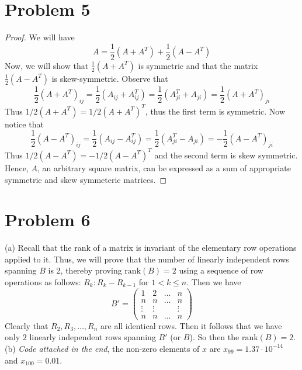 \documentclass{article}
\begin{document}
\section*{Problem 5}
\begin{proof} We will have
\begin{equation*}
    A = \frac{1}{2}(A + A^{T}) + \frac{1}{2}(A - A^{T})
\end{equation*}
Now, we will show that $\frac{1}{2}(A + A^{T})$ is symmetric and that the matrix $\frac{1}{2}(A-A^{T})$ is skew-symmetric. Observe that
\begin{equation*}
    \frac{1}{2}(A+A^{T})_{ij} = \frac{1}{2}(A_{ij} + A^{T}_{ij}) = \frac{1}{2}(A^{T}_{ji} + A_{ji}) = \frac{1}{2}(A + A^{T})_{ji}
\end{equation*}
Thus $1/2(A+A^{T}) = 1/2(A+A^{T})^{T}$, thus the first term is symmetric. Now notice that
\begin{equation*}
    \frac{1}{2}(A-A^{T})_{ij} = \frac{1}{2}(A_{ij} - A^{T}_{ij}) = \frac{1}{2}(A^{T}_{ji} - A_{ji}) = -\frac{1}{2}(A - A^{T})_{ji}
\end{equation*}
Thus $1/2(A-A^{T}) = -1/2(A-A^{T})^{T}$ and the second term is skew symmetric. Hence, $A$, an arbitrary square matrix, can be expressed as a sum of appropriate symmetric and skew symmeteric matrices.
\end{proof}
\section*{Problem 6}
(a) Recall that the rank of a matrix is invariant of the elementary row operations applied to it. Thus, we will prove that the number of linearly independent rows spanning $B$ is 2, thereby proving $\text{rank}(B) = 2$ using a sequence of row operations as follows: $R_{k} : R_{k} - R_{k-1}$ for $1 < k \leq n$. Then we have
\begin{equation*}
    B' = \begin{pmatrix}
        1 & 2 & \dots & n\\
        n & n & \dots & n \\
        \vdots & \vdots & &\vdots \\
         n &  n & \dots & n
    \end{pmatrix}
\end{equation*}
Clearly that $R_{2},R_{3},\dots,R_{n}$ are all identical rows. Then it follows that we have only $2$ linearly independent rows spanning $B'$ (or $B$). So then the $\text{rank}(B) = 2$.\\
(b) \emph{Code attached in the end}, the non-zero elements of $x$ are $x_{99} = 1.37\cdot 10^{-14}$ and $x_{100} = 0.01$. 

\end{document}
